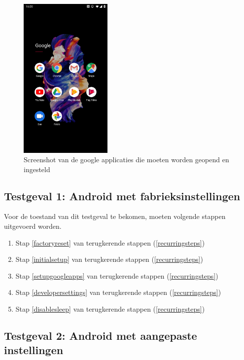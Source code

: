 \begin{figure}
    \centering
    \includegraphics[width=0.4\textwidth]{img/googleapps.jpg}
    \caption{Screenshot van de google applicaties die moeten worden geopend en ingesteld}
    \label{fig:googleapps}
\end{figure}

\subsection{Testgeval 1: Android met fabrieksinstellingen}

Voor de toestand van dit testgeval te bekomen, moeten volgende stappen uitgevoerd worden.
\begin{enumerate}
    \item Stap \ref{factoryreset} van terugkerende stappen (\ref{recurringsteps})
    \item Stap \ref{initialsetup} van terugkerende stappen (\ref{recurringsteps})
    \item Stap \ref{setupgoogleapps} van terugkerende stappen (\ref{recurringsteps})
    \item Stap \ref{developersettings} van terugkerende stappen (\ref{recurringsteps})
    \item Stap \ref{disablesleep} van terugkerende stappen (\ref{recurringsteps})
\end{enumerate}


\subsection{Testgeval 2: Android met aangepaste instellingen}

